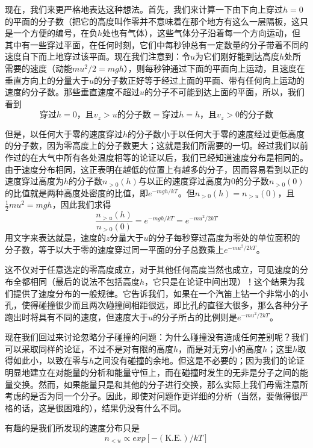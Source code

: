 现在，我们来更严格地表达这种想法。首先，我们来计算一下由下向上穿过$h=0$的平面的分子数（把它的高度叫作零并不意味着在那个地方有这么一层隔板，这只是一个方便的编号，在负$h$处也有气体），这些气体分子沿着每一个方向运动，但其中有一些穿过平面，在任何时刻，它们中每秒钟总有一定数量的分子带着不同的速度自下而上地穿过该平面。现在我们注意到：令$u$为它们刚好能到达高度$h$处所需要的速度（动能$mu^2/2=mgh$），则每秒钟通过下面的平面向上运动，且速度在垂直方向上的分量大于$u$的分子数正好等于经过上面的平面、带有任何向上运动的速度的分子数。那些垂直速度不超过$u$的分子不可能到达上面的平面，所以，我们看到
\begin{equation*}
    \text{穿过$h=0$，且$v_z>u$的分子数}=\text{穿过$h=h$，且$v_z>0$的分子数}
\end{equation*}

但是，以任何大于零的速度穿过$h$的分子数小于以任何大于零的速度经过更低高度的分子数，因为零高度上的分子数更大；这就是我们所需要的一切。经过我们以前作过的在大气中所有各处温度相等的论证以后，我们已经知道速度分布是相同的。由于速度分布相同，这正表明在越低的位置上有越多的分子，因而容易看到以正的速度穿过高度为$h$的分子数$n_{>0}(h)$与以正的速度穿过高度为$0$的分子数$n_{>0}(0)$的比值就是两种高度处密度的比值，即$e^{-mgh/kT}$。但$n_{>0}(h)=n_{>u}(0)$，且$\frac{1}{2}mu^2 = mgh$，因此我们求得
\begin{equation*}
    \frac{n_{>u}(h)}{n_{>0}(0)} = e^{-mgh/kT} = e^{-mu^2/2kT}
\end{equation*}
用文字来表达就是，速度的$z$分量大于$u$的分子每秒穿过高度为零处的单位面积的分子数，等于以大于零的速度穿过同一平面的分子总数乘上$e^{-mu^2/2kT}$。

这不仅对于任意选定的零高度成立，对于其他任何高度当然也成立，可见速度的分布全都相同（最后的说法不包括高度$h$，它只是在论证中间出现）！这个结果为我们提供了速度分布的一般规律。它告诉我们，如果在一个汽笛上钻一个非常小的小孔，使得碰撞很少而且两次碰撞间相距很远，即比孔的直径大很多，那么各种分子跑出时将具有不同的速度，但速度大于$u$的分子所占的比例则是$e^{-mu^2/2kT}$。

现在我们回过来讨论忽略分子碰撞的问题：为什么碰撞没有造成任何差别呢？我们可以采取同样的论证，不过不是对有限的高度$h$，而是对无穷小的高度$h$；这里$h$取得如此小，以致在零与$h$之间没有碰撞的余地。但这是不必要的；因为我们的论证明显地建立在对能量的分析和能量守恒上，而在碰撞时发生的无非是分子之间的能量交换。然而，如果能量只是和其他的分子进行交换，那么实际上我们毋需注意所考虑的是否为同一个分子。因此，即使对问题作更详细的分析（当然，要做得很严格的话，这是很困难的），结果仍没有什么不同。

有趣的是我们所发现的速度分布只是
\begin{equation}
    \label{Eq:I:40:4}
    n_{<u} \propto exp[-(\text{K.E.})/kT] 
\end{equation}

